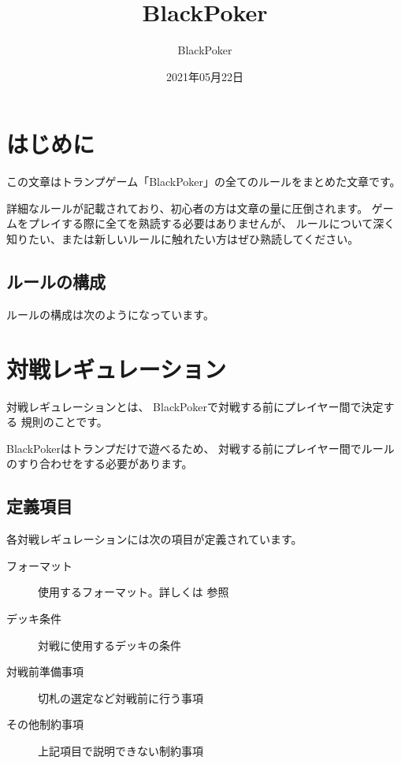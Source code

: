 \documentclass[letterpaper,10pt,dvipdfmx]{sphinxmanual}
\title{BlackPoker}
\date{2021年05月22日}
\author{BlackPoker}
\begin{document}
\pagestyle{empty}
\sphinxmaketitle
\pagestyle{plain}
\sphinxtableofcontents
\pagestyle{normal}
\label{\detokenize{index::doc}}



\chapter{はじめに}
\label{\detokenize{init/init:id1}}\label{\detokenize{init/init::doc}}
この文章はトランプゲーム「BlackPoker」の全てのルールをまとめた文章です。

詳細なルールが記載されており、初心者の方は文章の量に圧倒されます。
ゲームをプレイする際に全てを熟読する必要はありませんが、
ルールについて深く知りたい、または新しいルールに触れたい方はぜひ熟読してください。


\section{ルールの構成}
\label{\detokenize{init/init:id2}}
ルールの構成は次のようになっています。

\noindent{}


\chapter{対戦レギュレーション}
\label{\detokenize{match-regulations/match-regulations:id1}}\label{\detokenize{match-regulations/match-regulations::doc}}
対戦レギュレーションとは、
BlackPokerで対戦する前にプレイヤー間で決定する
規則のことです。

BlackPokerはトランプだけで遊べるため、
対戦する前にプレイヤー間でルールのすり合わせをする必要があります。


\section{定義項目}
\label{\detokenize{match-regulations/match-regulations:id2}}
各対戦レギュレーションには次の項目が定義されています。
\begin{description}
\item[{フォーマット}] \leavevmode
使用するフォーマット。詳しくは {\hyperref[\detokenize{format/format::doc}]{}} 参照

\item[{デッキ条件}] \leavevmode
対戦に使用するデッキの条件

\item[{対戦前準備事項}] \leavevmode
切札の選定など対戦前に行う事項

\item[{その他制約事項}] \leavevmode
上記項目で説明できない制約事項

\end{description}
\end{document}
